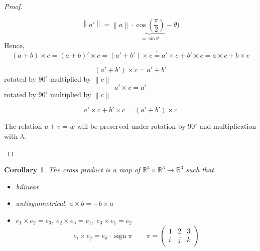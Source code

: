 \documentclass[a4paper]{article}
\newcounter{lecref}[section]
\numberwithin{lecref}{section}
\newtheorem{corollary}[lecref]{Corollary}
\newcommand{\norm}[1]{\left\|#1\right\|}
\DeclareMathOperator{\sign}{sign}
\begin{document}
\begin{proof}
\begin{itemize}
\begin{enumerate}
          \[ \norm{a'} = \norm{a} \cdot \underbrace{\cos\left(\frac\pi2\right)}_{=\sin\theta} - \theta) \]
          Hence,
          \[ (a + b) \times c = (a + b)' \times c = (a' + b') \times c \stackrel!= a' \times c + b' \times c = a \times c + b \times c \]

          \[ (a' + b') \times c = a' + b' \]
          rotated by $90^\circ$ multiplied by $\norm{c}$
          \[ a' \times c = a' \]
          rotated by $90^\circ$ multiplied by $\norm{c}$

          \[ a' \times c + b' \times c = (a' + b') \times c \]

          The relation $u + v = w$ will be preserved under rotation by $90^\circ$ and multiplication with $\lambda$.
      \end{enumerate}
  \end{itemize}
\end{proof}

\begin{corollary} %
  The cross product is a map of $\mathbb R^3 \times \mathbb R^3 \to \mathbb R^3$
  such that
  \begin{itemize}
    \item bilinear
    \item antisymmetrical, $a \times b = -b \times a$
    \item $e_1 \times e_2 = e_3$, $e_2 \times e_3 = e_1$, $e_3 \times e_1 = e_2$
      \[ e_i \times e_j = e_k \cdot \sign{\pi} \qquad \pi = \begin{pmatrix} 1 & 2 & 3 \\ i & j & k \end{pmatrix} \]
  \end{itemize}
\end{corollary}
\end{document}
